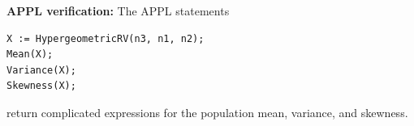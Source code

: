 \documentclass[12pt,fullpage]{article}
\begin{document}
\vspace{0.1in}

\newpage

\noindent
{\bf APPL verification:}
The APPL statements
\begin{verbatim}
X := HypergeometricRV(n3, n1, n2);
Mean(X);
Variance(X);
Skewness(X);
\end{verbatim}
return complicated expressions for the population mean, variance, and skewness. 
\end{document}
